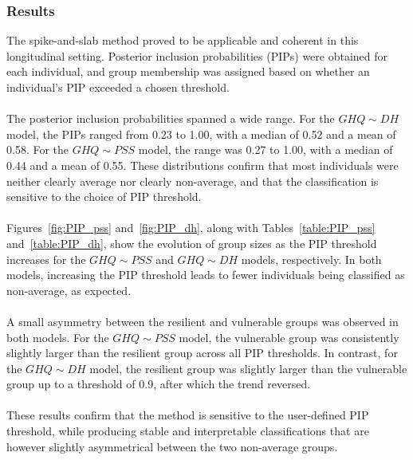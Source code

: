 \documentclass[12pt]{article}
\begin{document}
\subsubsection{Results}
The spike-and-slab method proved to be applicable and coherent in this longitudinal setting. Posterior inclusion probabilities (PIPs) were obtained for each individual, and group membership was assigned based on whether an individual’s PIP exceeded a chosen threshold. \\
\\
The posterior inclusion probabilities spanned a wide range. For the $GHQ\sim DH$ model, the PIPs ranged from 0.23 to 1.00, with a median of 0.52 and a mean of 0.58. For the $GHQ \sim PSS$ model, the range was 0.27 to 1.00, with a median of 0.44 and a mean of 0.55. These distributions confirm that most individuals were neither clearly average nor clearly non-average, and that the classification is sensitive to the choice of PIP threshold.\\
\\
Figures~\ref{fig:PIP_pss} and~\ref{fig:PIP_dh}, along with Tables~\ref{table:PIP_pss} and~\ref{table:PIP_dh}, show the evolution of group sizes as the PIP threshold increases for the $GHQ\sim PSS$ and $GHQ\sim DH$ models, respectively. In both models, increasing the PIP threshold leads to fewer individuals being classified as non-average, as expected.\\
\\
A small asymmetry between the resilient and vulnerable groups was observed in both models. For the $GHQ\sim PSS$  model, the vulnerable group was consistently slightly larger than the resilient group across all PIP thresholds. In contrast, for the $GHQ\sim DH$ model, the resilient group was slightly larger than the vulnerable group up to a threshold of 0.9, after which the trend reversed.\\
\\
These results confirm that the method is sensitive to the user-defined PIP threshold, while producing stable and interpretable classifications that are however slightly asymmetrical between the two non-average groups.
\end{document}
